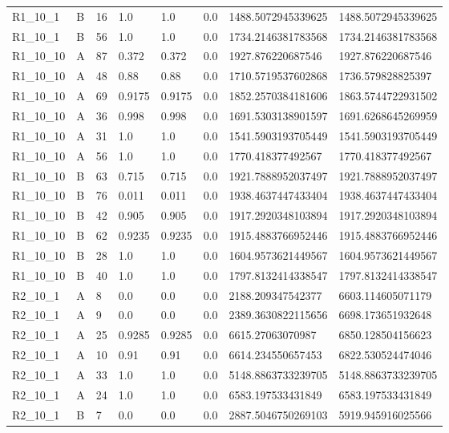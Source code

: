 \begin{tabular}{llllllll}
 R1\_10\_1 & B & 16 & 1.0 & 1.0 & 0.0 & 1488.5072945339625 & 1488.5072945339625 \\
 R1\_10\_1 & B & 56 & 1.0 & 1.0 & 0.0 & 1734.2146381783568 & 1734.2146381783568 \\
 R1\_10\_10 & A & 87 & 0.372 & 0.372 & 0.0 & 1927.876220687546 & 1927.876220687546 \\
 R1\_10\_10 & A & 48 & 0.88 & 0.88 & 0.0 & 1710.5719537602868 & 1736.579828825397 \\
 R1\_10\_10 & A & 69 & 0.9175 & 0.9175 & 0.0 & 1852.2570384181606 & 1863.5744722931502 \\
 R1\_10\_10 & A & 36 & 0.998 & 0.998 & 0.0 & 1691.5303138901597 & 1691.6268645269959 \\
 R1\_10\_10 & A & 31 & 1.0 & 1.0 & 0.0 & 1541.5903193705449 & 1541.5903193705449 \\
 R1\_10\_10 & A & 56 & 1.0 & 1.0 & 0.0 & 1770.418377492567 & 1770.418377492567 \\
 R1\_10\_10 & B & 63 & 0.715 & 0.715 & 0.0 & 1921.7888952037497 & 1921.7888952037497 \\
 R1\_10\_10 & B & 76 & 0.011 & 0.011 & 0.0 & 1938.4637447433404 & 1938.4637447433404 \\
 R1\_10\_10 & B & 42 & 0.905 & 0.905 & 0.0 & 1917.2920348103894 & 1917.2920348103894 \\
 R1\_10\_10 & B & 62 & 0.9235 & 0.9235 & 0.0 & 1915.4883766952446 & 1915.4883766952446 \\
 R1\_10\_10 & B & 28 & 1.0 & 1.0 & 0.0 & 1604.9573621449567 & 1604.9573621449567 \\
 R1\_10\_10 & B & 40 & 1.0 & 1.0 & 0.0 & 1797.8132414338547 & 1797.8132414338547 \\
 R2\_10\_1 & A & 8 & 0.0 & 0.0 & 0.0 & 2188.209347542377 & 6603.114605071179 \\
 R2\_10\_1 & A & 9 & 0.0 & 0.0 & 0.0 & 2389.3630822115656 & 6698.173651932648 \\
 R2\_10\_1 & A & 25 & 0.9285 & 0.9285 & 0.0 & 6615.27063070987 & 6850.128504156623 \\
 R2\_10\_1 & A & 10 & 0.91 & 0.91 & 0.0 & 6614.234550657453 & 6822.530524474046 \\
 R2\_10\_1 & A & 33 & 1.0 & 1.0 & 0.0 & 5148.8863733239705 & 5148.8863733239705 \\
 R2\_10\_1 & A & 24 & 1.0 & 1.0 & 0.0 & 6583.197533431849 & 6583.197533431849 \\
 R2\_10\_1 & B & 7 & 0.0 & 0.0 & 0.0 & 2887.5046750269103 & 5919.945916025566 \\

\end{tabular}
